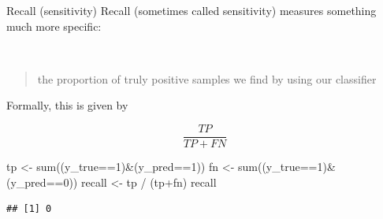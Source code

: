\documentclass[
  10pt,
  ignorenonframetext,
  aspectratio=169]{beamer}
\newenvironment{Shaded}{\begin{snugshade}}{\end{snugshade}}
\newcommand{\DecValTok}[1]{\textcolor[rgb]{0.86,0.86,0.80}{#1}}
\newcommand{\FunctionTok}[1]{\textcolor[rgb]{0.94,0.94,0.56}{#1}}
\newcommand{\NormalTok}[1]{\textcolor[rgb]{0.80,0.80,0.80}{#1}}
\newcommand{\OtherTok}[1]{\textcolor[rgb]{0.94,0.94,0.56}{#1}}
\newcommand{\SpecialCharTok}[1]{\textcolor[rgb]{0.86,0.64,0.64}{#1}}
\begin{document}
\begin{frame}[fragile]{Recall (sensitivity)}
\protect\hypertarget{recall-sensitivity}{}
Recall (sometimes called sensitivity) measures something much more
specific:

~

\begin{quote}
the proportion of truly positive samples we find by using our classifier
\end{quote}

Formally, this is given by

\[ \frac{TP}{TP+FN}\]

\scriptsize

\begin{Shaded}
\begin{Highlighting}[]
\NormalTok{tp }\OtherTok{\textless{}{-}} \FunctionTok{sum}\NormalTok{((y\_true}\SpecialCharTok{==}\DecValTok{1}\NormalTok{)}\SpecialCharTok{\&}\NormalTok{(y\_pred}\SpecialCharTok{==}\DecValTok{1}\NormalTok{))}
\NormalTok{fn }\OtherTok{\textless{}{-}} \FunctionTok{sum}\NormalTok{((y\_true}\SpecialCharTok{==}\DecValTok{1}\NormalTok{)}\SpecialCharTok{\&}\NormalTok{(y\_pred}\SpecialCharTok{==}\DecValTok{0}\NormalTok{))}
\NormalTok{recall }\OtherTok{\textless{}{-}}\NormalTok{ tp }\SpecialCharTok{/}\NormalTok{ (tp}\SpecialCharTok{+}\NormalTok{fn)}
\NormalTok{recall}
\end{Highlighting}
\end{Shaded}

\begin{verbatim}
## [1] 0
\end{verbatim}
\end{frame}
\end{document}
